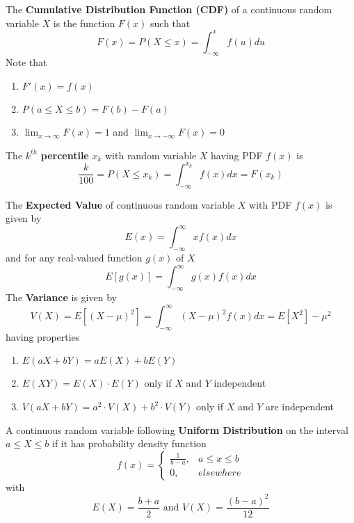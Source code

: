 \documentclass[11pt]{article}
\begin{document}
$ $\\
The \textbf{Cumulative Distribution Function (CDF)} of a continuous random variable $X$ is the function $F(x)$ such that
\[
  F(x) = P(X\leq x) = \int_{-\infty}^x f(u) du
\]
Note that
\begin{enumerate}
  \item $F'(x) = f(x)$
  \item $P(a\leq X \leq b) = F(b) - F(a)$
  \item $\lim_{x\to \infty} F(x) = 1$  and $\lim_{x\to -\infty} F(x) = 0$
\end{enumerate}


$ $\\
The $k^{th}$ \textbf{percentile} $x_k$ with random variable $X$ having PDF $f(x)$ is
\[
  \frac{k}{100} = P(X\leq x_k) = \int_{-\infty}^{x_k} f(x) dx = F(x_k)
\]

$ $\\
The \textbf{Expected Value} of continuous random variable $X$ with PDF $f(x)$ is given by
\[
  E(x) = \int_{-\infty}^{\infty} xf(x) dx
\]
and for any real-valued function $g(x)$ of $X$
\[
  E[g(x)] = \int_{-\infty}^{\infty} g(x)f(x) dx
\]
The \textbf{Variance} is given by
\[
  V(X) = E[(X-\mu)^2] = \int_{-\infty}^{\infty} (X-\mu)^2 f(x) dx = E[X^2] - \mu^2
\]
having properties
\begin{enumerate}
  \item $E(aX +bY) = aE(X) + bE(Y)$
  \item $E(XY) = E(X)\cdot E(Y)$ only if $X$ and $Y$ independent
  \item $V(aX + bY) = a^2 \cdot V(X) + b^2 \cdot V(Y)$ only if $X$ and $Y$ are independent
\end{enumerate}


$ $\\
A continuous random variable following \textbf{Uniform Distribution} on the interval $a\leq X \leq b$ if it has probability density function
\[
  f(x) =
  \begin{cases}
    \frac{1}{b-a}, & a\leq x\leq b\\
    0, & elsewhere
  \end{cases}
\]
with
\[
  E(X) = \frac{b+a}{2} \text{ and } V(X) = \frac{(b-a)^2}{12}
\]
\end{document}
